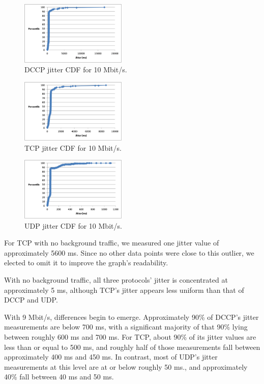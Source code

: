 \begin{figure}[!h]
   \centering
      \includegraphics[width=0.45\textwidth]{pics/dccp_10_jitter}
   \caption{DCCP jitter CDF for 10 Mbit/s.}
\label{fig:dccp_10_jitter}
\end{figure}

\begin{figure}[!h]
   \centering
      \includegraphics[width=0.45\textwidth]{pics/tcp_10_jitter}
   \caption{TCP jitter CDF for 10 Mbit/s.}
\label{fig:tcp_10_jitter}
\end{figure}

\begin{figure}[!h]
   \centering
      \includegraphics[width=0.45\textwidth]{pics/udp_10_jitter}
   \caption{UDP jitter CDF for 10 Mbit/s.}
\label{fig:udp_10_jitter}
\end{figure}

For TCP with no background traffic, we measured one jitter value of
approximately 5600 ms. Since no other data points were close to this outlier, we
elected to omit it to improve the graph's readability.

With no background traffic, all three protocols' jitter is concentrated at
approximately 5 ms, although TCP's jitter appears less uniform than that of DCCP
and UDP.

With 9 Mbit/s, differences begin to emerge. Approximately 90\% of DCCP's jitter
measurements are below 700 ms, with a significant majority of that 90\% lying
between roughly 600 ms and 700 ms. For TCP, about 90\% of its jitter values are
less than or equal to 500 ms, and roughly half of those measurements fall
between approximately 400 ms and 450 ms. In contrast, most of UDP's jitter
measurements at this level are at or below roughly 50 ms., and approximately
40\% fall between 40 ms and 50 ms.

